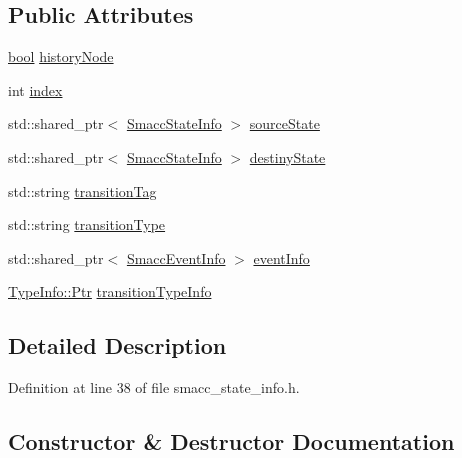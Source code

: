 \subsection*{Public Attributes}
\begin{DoxyCompactItemize}
\item 
\hyperlink{classbool}{bool} \hyperlink{structsmacc_1_1introspection_1_1SmaccTransitionInfo_acbb8f7891dd0c541b26feb82149cb780}{history\+Node}
\item 
int \hyperlink{structsmacc_1_1introspection_1_1SmaccTransitionInfo_a4b9e9f140aefd8ecd6697bcaa4b681af}{index}
\item 
std\+::shared\+\_\+ptr$<$ \hyperlink{classsmacc_1_1introspection_1_1SmaccStateInfo}{Smacc\+State\+Info} $>$ \hyperlink{structsmacc_1_1introspection_1_1SmaccTransitionInfo_aa44f16d098eb91ed222008fe0abf1275}{source\+State}
\item 
std\+::shared\+\_\+ptr$<$ \hyperlink{classsmacc_1_1introspection_1_1SmaccStateInfo}{Smacc\+State\+Info} $>$ \hyperlink{structsmacc_1_1introspection_1_1SmaccTransitionInfo_a041f159a4cd56cfbc005765d093d0d4a}{destiny\+State}
\item 
std\+::string \hyperlink{structsmacc_1_1introspection_1_1SmaccTransitionInfo_aece8c6af9a682232a435ca1d92b953bd}{transition\+Tag}
\item 
std\+::string \hyperlink{structsmacc_1_1introspection_1_1SmaccTransitionInfo_a8f4682c18a3b6c09f6b942a4fa7b524d}{transition\+Type}
\item 
std\+::shared\+\_\+ptr$<$ \hyperlink{structsmacc_1_1introspection_1_1SmaccEventInfo}{Smacc\+Event\+Info} $>$ \hyperlink{structsmacc_1_1introspection_1_1SmaccTransitionInfo_a573be95bb6fdeeae46fc5ed56b260138}{event\+Info}
\item 
\hyperlink{classsmacc_1_1introspection_1_1TypeInfo_aa6ffd9c39811d59f7c771941b7fad860}{Type\+Info\+::\+Ptr} \hyperlink{structsmacc_1_1introspection_1_1SmaccTransitionInfo_abe702ee8041ad32f2290b99c17ab9d95}{transition\+Type\+Info}
\end{DoxyCompactItemize}


\subsection{Detailed Description}


Definition at line 38 of file smacc\+\_\+state\+\_\+info.\+h.



\subsection{Constructor \& Destructor Documentation}
